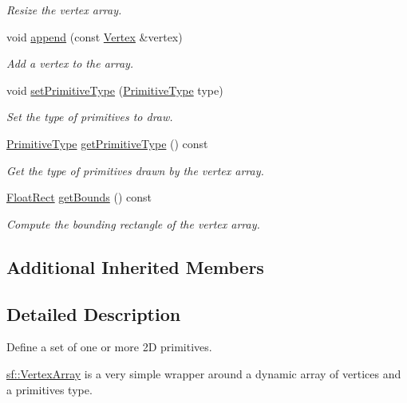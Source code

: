 \begin{DoxyCompactItemize}
\begin{DoxyCompactList}\small\item\em Resize the vertex array. \end{DoxyCompactList}\item 
void \hyperlink{classsf_1_1_vertex_array_a80c8f6865e53bd21fc6cb10fffa10035}{append} (const \hyperlink{classsf_1_1_vertex}{Vertex} \&vertex)
\begin{DoxyCompactList}\small\item\em Add a vertex to the array. \end{DoxyCompactList}\item 
void \hyperlink{classsf_1_1_vertex_array_aa38c10707c28a97f4627ae8b2f3ad969}{set\+Primitive\+Type} (\hyperlink{group__graphics_ga5ee56ac1339984909610713096283b1b}{Primitive\+Type} type)
\begin{DoxyCompactList}\small\item\em Set the type of primitives to draw. \end{DoxyCompactList}\item 
\hyperlink{group__graphics_ga5ee56ac1339984909610713096283b1b}{Primitive\+Type} \hyperlink{classsf_1_1_vertex_array_af2205f76fe98fb3cf1f303f25d43c045}{get\+Primitive\+Type} () const 
\begin{DoxyCompactList}\small\item\em Get the type of primitives drawn by the vertex array. \end{DoxyCompactList}\item 
\hyperlink{classsf_1_1_rect}{Float\+Rect} \hyperlink{classsf_1_1_vertex_array_a741d1b1acbb175289eab37bbf49cbb24}{get\+Bounds} () const 
\begin{DoxyCompactList}\small\item\em Compute the bounding rectangle of the vertex array. \end{DoxyCompactList}\end{DoxyCompactItemize}
\subsection*{Additional Inherited Members}


\subsection{Detailed Description}
Define a set of one or more 2\+D primitives. 

\hyperlink{classsf_1_1_vertex_array}{sf\+::\+Vertex\+Array} is a very simple wrapper around a dynamic array of vertices and a primitives type.

